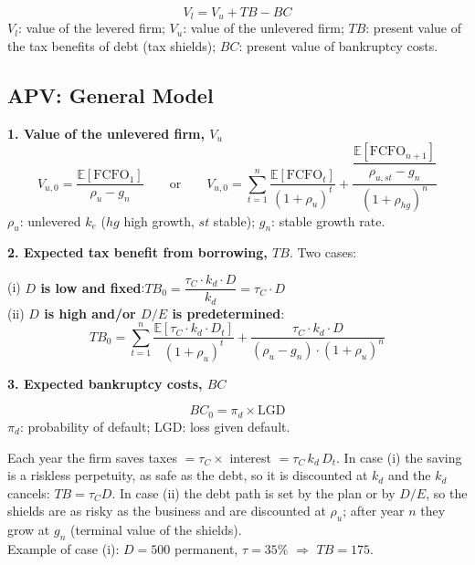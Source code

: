 \begin{keybox}[APV]
\[
\boxed{V_l = V_u + TB - BC}
\]
$V_l$: value of the levered firm; $V_u$: value of the unlevered firm; $TB$: present value of the tax benefits of debt (tax shields); $BC$: present value of bankruptcy costs.
\end{keybox}

\subsection[APV: General Model]{APV: General Model }

\textbf{1. Value of the unlevered firm, $V_u$}
\[
V_{u,0}=\frac{\mathbb{E}[\text{FCFO}_1]}{\rho_u-g_n}\qquad\text{or}\qquad
V_{u,0}=\sum_{t=1}^{n}\frac{\mathbb{E}[\text{FCFO}_t]}{(1+\rho_u)^t}+\frac{\dfrac{\mathbb{E}[\text{FCFO}_{n+1}]}{\rho_{u,st}-g_n}}{(1+\rho_{hg})^n}
\]
$\rho_u$: unlevered $k_e$ ($hg$ high growth, $st$ stable); $g_n$: stable growth rate.

\textbf{2. Expected tax benefit from borrowing, $TB$}. Two cases:
\begin{keybox}
(i) \textbf{$D$ is low and fixed}:\quad $TB_0=\dfrac{\tau_C\cdot k_d\cdot D}{k_d}=\tau_C\cdot D$\\[6pt]
(ii) \textbf{$D$ is high and/or $D/E$ is predetermined}:
\[
TB_0=\sum_{t=1}^{n}\frac{\mathbb{E}[\tau_C\cdot k_d\cdot D_t]}{(1+\rho_u)^t}+\frac{\tau_C\cdot k_d\cdot D}{(\rho_u-g_n)\cdot(1+\rho_u)^n}
\]
\end{keybox}
\textbf{3. Expected bankruptcy costs, $BC$}
\begin{keybox}
\[
BC_0=\pi_d\times\text{LGD}
\]
$\pi_d$: probability of default; LGD: loss given default.
\end{keybox}

\begin{addbox}
Each year the firm saves taxes $=\tau_C\times$ interest $=\tau_C\,k_d\,D_t$. In case (i) the saving is a riskless perpetuity, as safe as the debt, so it is discounted at $k_d$ and the $k_d$ cancels: $TB=\tau_C D$. In case (ii) the debt path is set by the plan or by $D/E$, so the shields are as risky as the business and are discounted at $\rho_u$; after year $n$ they grow at $g_n$ (terminal value of the shields).\\
Example of case (i): $D=500$ permanent, $\tau=35\%$ $\Rightarrow$ $TB=175$.
\end{addbox}

